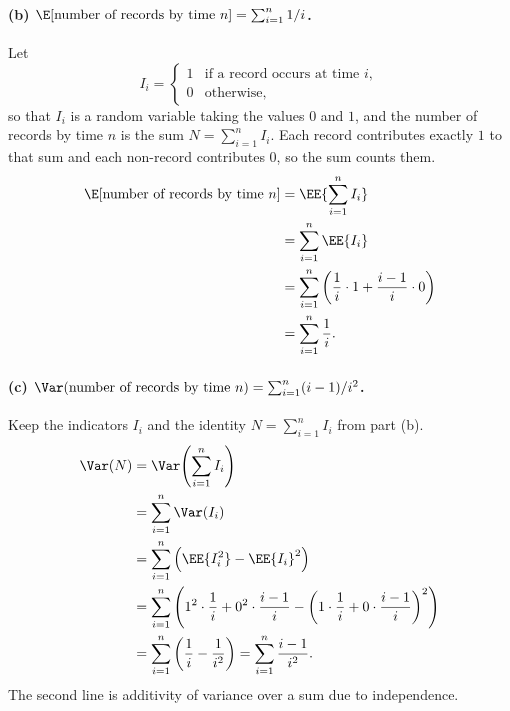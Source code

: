 \documentclass[11pt]{article}
\begin{document}
\paragraph{(b) $\E[\text{number of records by time } n] = \sum_{i=1}^{n} 1/i$.}
Let
\[
  I_i =
  \begin{cases}
    1 & \text{if a record occurs at time } i,\\
    0 & \text{otherwise,}
  \end{cases}
\]
so that $I_i$ is a random variable taking the values $0$ and $1$, and the number of
records by time $n$ is the sum $N = \sum_{i=1}^{n} I_i$. Each record contributes exactly
$1$ to that sum and each non-record contributes $0$, so the sum counts them.
\begin{align*}
  \E[\text{number of records by time } n]
    &= \EE{\sum_{i=1}^{n} I_i}\\
    &= \sum_{i=1}^{n} \EE{I_i}\\
    &= \sum_{i=1}^{n} \left(\frac{1}{i}\cdot 1 + \frac{i-1}{i}\cdot 0\right)\\
    &= \sum_{i=1}^{n} \frac{1}{i} .
\end{align*}

\paragraph{(c) $\Var(\text{number of records by time } n) = \sum_{i=1}^{n} (i-1)/i^2$.}
Keep the indicators $I_i$ and the identity $N = \sum_{i=1}^{n} I_i$ from part (b).
\begin{align*}
  \Var(N)
    &= \Var\!\left(\sum_{i=1}^{n} I_i\right)\\
    &= \sum_{i=1}^{n} \Var(I_i)\\
    &= \sum_{i=1}^{n} \left(\EE{I_i^2} - \EE{I_i}^2\right)\\
    &= \sum_{i=1}^{n}
       \left(1^2\cdot\frac{1}{i} + 0^2\cdot\frac{i-1}{i}
             - \left(1\cdot\frac{1}{i} + 0\cdot\frac{i-1}{i}\right)^{2}\right)\\
    &= \sum_{i=1}^{n} \left(\frac{1}{i} - \frac{1}{i^2}\right)
     = \sum_{i=1}^{n} \frac{i-1}{i^2} .
\end{align*}
The second line is additivity of variance over a sum due to independence.
\end{document}
